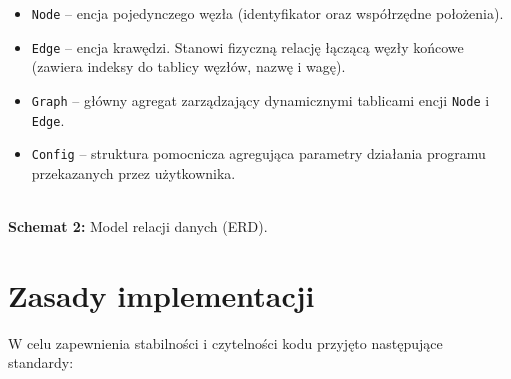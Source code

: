 \documentclass[12pt,a4paper]{article}
\begin{document}
\begin{itemize} 
    \item \texttt{Node} -- encja pojedynczego węzła (identyfikator oraz współrzędne położenia). 
    \item \texttt{Edge} -- encja krawędzi. Stanowi fizyczną relację łączącą węzły końcowe (zawiera indeksy do tablicy węzłów, nazwę i wagę). 
    \item \texttt{Graph} -- główny agregat zarządzający dynamicznymi tablicami encji \texttt{Node} i \texttt{Edge}. 
    \item \texttt{Config} -- struktura pomocnicza agregująca parametry działania programu przekazanych przez użytkownika. 
\end{itemize} 

\vspace{1cm} 
\begin{center} 
    \\ \vspace{0.4cm} 
    \textbf{Schemat 2:} Model relacji danych (ERD). 
\end{center} 

\vspace{1cm} 

\section{Zasady implementacji}

W celu zapewnienia stabilności i czytelności kodu przyjęto następujące standardy: 
\end{document}

